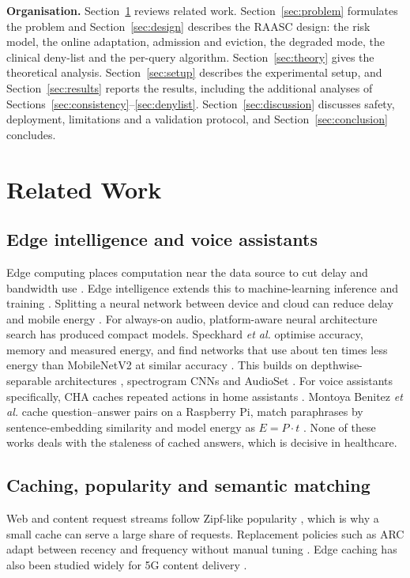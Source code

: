 \documentclass[journal]{IEEEtran}
\begin{document}
\textbf{Organisation.} Section~\ref{sec:related} reviews related work. Section~\ref{sec:problem} formulates the problem and Section~\ref{sec:design} describes the RAASC design: the risk model, the online adaptation, admission and eviction, the degraded mode, the clinical deny-list and the per-query algorithm. Section~\ref{sec:theory} gives the theoretical analysis. Section~\ref{sec:setup} describes the experimental setup, and Section~\ref{sec:results} reports the results, including the additional analyses of Sections~\ref{sec:consistency}--\ref{sec:denylist}. Section~\ref{sec:discussion} discusses safety, deployment, limitations and a validation protocol, and Section~\ref{sec:conclusion} concludes.

\section{Related Work}\label{sec:related}
\subsection{Edge intelligence and voice assistants}
Edge computing places computation near the data source to cut delay and bandwidth use \cite{shi2016}. Edge intelligence extends this to machine-learning inference and training \cite{zhou2019}. Splitting a neural network between device and cloud can reduce delay and mobile energy \cite{kang2017}. For always-on audio, platform-aware neural architecture search \cite{tan2019,golovin2017} has produced compact models. Speckhard \emph{et al.} optimise accuracy, memory and measured energy, and find networks that use about ten times less energy than MobileNetV2 \cite{sandler2018} at similar accuracy \cite{speckhard2023}. This builds on depthwise-separable architectures \cite{sandler2018,howard2017}, spectrogram CNNs \cite{hershey2017} and AudioSet \cite{gemmeke2017}. For voice assistants specifically, CHA caches repeated actions in home assistants \cite{xu2020}. Montoya Benitez \emph{et al.} cache question--answer pairs on a Raspberry Pi, match paraphrases by sentence-embedding similarity and model energy as $E = P\cdot t$ \cite{montoya2025}. None of these works deals with the staleness of cached answers, which is decisive in healthcare.

\subsection{Caching, popularity and semantic matching}
Web and content request streams follow Zipf-like popularity \cite{breslau1999}, which is why a small cache can serve a large share of requests. Replacement policies such as ARC adapt between recency and frequency without manual tuning \cite{megiddo2003}. Edge caching has also been studied widely for 5G content delivery \cite{wang2014}.
\end{document}

